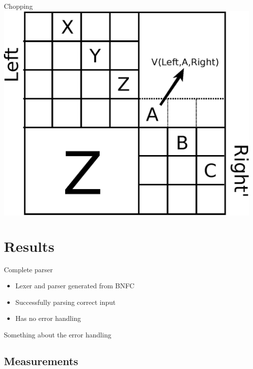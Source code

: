\documentclass{beamer}
\begin{document}
\begin{frame}{Chopping}
    \centering
    \includegraphics[width=.5\textwidth]{merge-with-chopping.eps}
\end{frame}

\section{Results}
\begin{frame}{Complete parser}
    \begin{itemize}
        \item Lexer and parser generated from BNFC
        \item Successfully parsing correct input
        \item Has no error handling
    \end{itemize}
\end{frame}

\begin{frame}
    Something about the error handling
\end{frame}

\subsection{Measurements}
\begin{frame}
\end{frame}

\begin{frame}
\end{frame}

\begin{frame}
\end{frame}

\begin{frame}
\end{frame}
\end{document}
